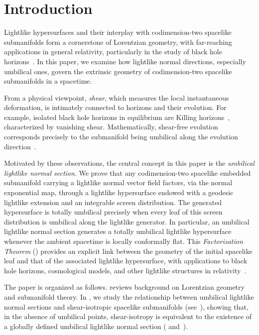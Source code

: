 \documentclass[11pt]{article}
\numberwithin{equation}{section}
\begin{document}
\section{Introduction}

Lightlike hypersurfaces and their interplay with codimension-two spacelike submanifolds form a cornerstone of Lorentzian geometry, with far-reaching applications in general relativity, particularly in the study of black hole horizons~\cite{DuggalGimenez, Duggal_Sahin, kupeli}. In this paper, we examine how lightlike normal directions, especially umbilical ones, govern the extrinsic geometry of codimension-two spacelike submanifolds in a spacetime.

From a physical viewpoint, \emph{shear}, which measures the local instantaneous deformation, is intimately connected to horizons and their evolution. For example, isolated black hole horizons in equilibrium are Killing horizons~\cite{Wald}, characterized by vanishing shear. Mathematically, shear-free evolution corresponds precisely to the submanifold being umbilical along the evolution direction~\cite{cipriani}.

Motivated by these observations, the central concept in this paper is the \emph{umbilical lightlike normal section}. We prove that any codimension-two spacelike embedded submanifold carrying a lightlike normal vector field factors, via the normal exponential map, through a lightlike hypersurface endowed with a geodesic lightlike extension and an integrable screen distribution. The generated hypersurface is totally umbilical precisely when every leaf of this screen distribution is umbilical along the lightlike generator. In particular, an umbilical lightlike normal section generates a totally umbilical lightlike hypersurface whenever the ambient spacetime is locally conformally flat. This \emph{Factorization Theorem} () provides an explicit link between the geometry of the initial spacelike leaf and that of the associated lightlike hypersurface, with applications to black hole horizons, cosmological models, and other lightlike structures in relativity~\cite{MinguzziSanchez}.

The paper is organized as follows.  reviews background on Lorentzian geometry and submanifold theory. In , we study the relationship between umbilical lightlike normal sections and shear-isotropic spacelike submanifolds (see~), showing that, in the absence of umbilical points, shear-isotropy is equivalent to the existence of a globally defined umbilical lightlike normal section ( and~).
\end{document}
